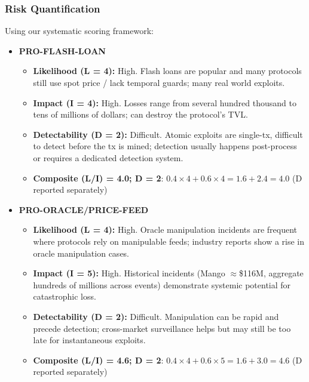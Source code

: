 \subsubsection{Risk Quantification}

Using our systematic scoring framework:

\begin{itemize}
    \item \textbf{PRO-FLASH-LOAN}
    \begin{itemize}
        \item \textbf{Likelihood (L = 4):} High. Flash loans are popular and many protocols still use spot price / lack temporal guards; many real world exploits.
        \item \textbf{Impact (I = 4):} High. Losses range from several hundred thousand to tens of millions of dollars; can destroy the protocol's TVL.
        \item \textbf{Detectability (D = 2):} Difficult. Atomic exploits are single-tx, difficult to detect before the tx is mined; detection usually happens post-process or requires a dedicated detection system.
        \item \textbf{Composite (L/I) = 4.0; D = 2}: $0.4 \times 4 + 0.6 \times 4 = 1.6 + 2.4 = 4.0$ (D reported separately)
    \end{itemize}
    
    \item \textbf{PRO-ORACLE/PRICE-FEED}
    \begin{itemize}
        \item \textbf{Likelihood (L = 4):} High. Oracle manipulation incidents are frequent where protocols rely on manipulable feeds; industry reports show a rise in oracle manipulation cases.
        \item \textbf{Impact (I = 5):} High. Historical incidents (Mango $\approx$\$116M, aggregate hundreds of millions across events) demonstrate systemic potential for catastrophic loss.
        \item \textbf{Detectability (D = 2):} Difficult. Manipulation can be rapid and precede detection; cross-market surveillance helps but may still be too late for instantaneous exploits.
        \item \textbf{Composite (L/I) = 4.6; D = 2}: $0.4 \times 4 + 0.6 \times 5 = 1.6 + 3.0 = 4.6$ (D reported separately)
    \end{itemize}
\end{itemize}
